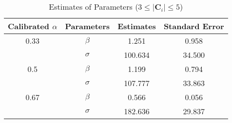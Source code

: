 \begin{table}[H]
    \centering
    \caption{Estimates of Parameters ($3 \leq |\mathbf{C}_i| \leq 5$)}
    \label{table: estimates (min_size=3 max_size=5 margin=1000)}
    \begin{tabular}{cccc}
        \toprule
        Calibrated $\alpha$ & Parameters & Estimates & Standard Error \\
        \midrule
        0.33                & $\beta$    & 1.251     & 0.958          \\
                            & $\sigma$   & 100.634   & 34.500         \\
        \midrule
        0.5                 & $\beta$    & 1.199     & 0.794          \\
                            & $\sigma$   & 107.777   & 33.863         \\
        \midrule
        0.67                & $\beta$    & 0.566     & 0.056          \\
                            & $\sigma$   & 182.636   & 29.837         \\
        \bottomrule
    \end{tabular}
\end{table}
